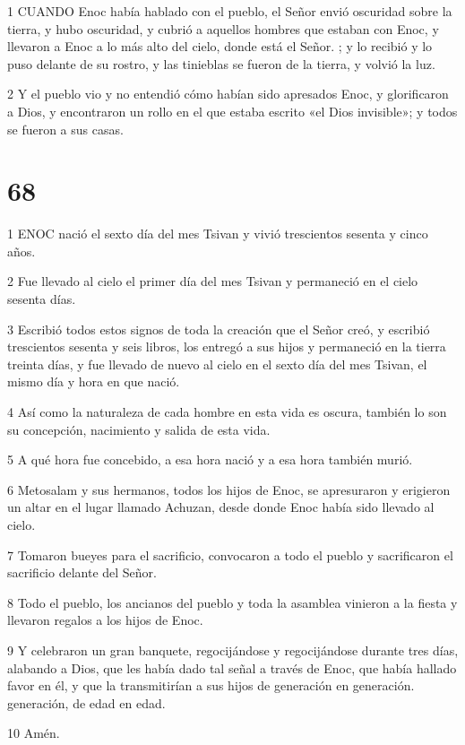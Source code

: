 \par 1 CUANDO Enoc había hablado con el pueblo, el Señor envió oscuridad sobre la tierra, y hubo oscuridad, y cubrió a aquellos hombres que estaban con Enoc, y llevaron a Enoc a lo más alto del cielo, donde está el Señor. ; y lo recibió y lo puso delante de su rostro, y las tinieblas se fueron de la tierra, y volvió la luz.

\par 2 Y el pueblo vio y no entendió cómo habían sido apresados ​​Enoc, y glorificaron a Dios, y encontraron un rollo en el que estaba escrito «el Dios invisible»; y todos se fueron a sus casas.

\chapter{68}

\par 1 ENOC nació el sexto día del mes Tsivan y vivió trescientos sesenta y cinco años.

\par 2 Fue llevado al cielo el primer día del mes Tsivan y permaneció en el cielo sesenta días.

\par 3 Escribió todos estos signos de toda la creación que el Señor creó, y escribió trescientos sesenta y seis libros, los entregó a sus hijos y permaneció en la tierra treinta días, y fue llevado de nuevo al cielo en el sexto día del mes Tsivan, el mismo día y hora en que nació.

\par 4 Así como la naturaleza de cada hombre en esta vida es oscura, también lo son su concepción, nacimiento y salida de esta vida.

\par 5 A qué hora fue concebido, a esa hora nació y a esa hora también murió.

\par 6 Metosalam y sus hermanos, todos los hijos de Enoc, se apresuraron y erigieron un altar en el lugar llamado Achuzan, desde donde Enoc había sido llevado al cielo.

\par 7 Tomaron bueyes para el sacrificio, convocaron a todo el pueblo y sacrificaron el sacrificio delante del Señor.

\par 8 Todo el pueblo, los ancianos del pueblo y toda la asamblea vinieron a la fiesta y llevaron regalos a los hijos de Enoc.

\par 9 Y celebraron un gran banquete, regocijándose y regocijándose durante tres días, alabando a Dios, que les había dado tal señal a través de Enoc, que había hallado favor en él, y que la transmitirían a sus hijos de generación en generación. generación, de edad en edad.

\par 10 Amén.



